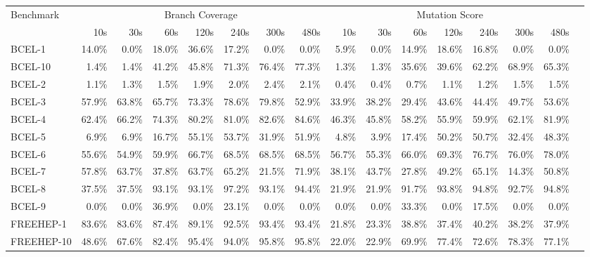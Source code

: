\begin{tabular}{ l rrrrrrr rrrrrrrr}\toprule 
 Benchmark &  \multicolumn{7}{c}{Branch Coverage} &  \multicolumn{7}{c}{Mutation Score}\\ 
 & 10s & 30s & 60s & 120s & 240s & 300s & 480s & 10s & 30s & 60s & 120s & 240s & 300s & 480s \\ 
\midrule 
BCEL-1 &  14.0\% &  0.0\% &  18.0\% &  36.6\% &  17.2\% &  0.0\% &  0.0\% &  5.9\% &  0.0\% &  14.9\% &  18.6\% &  16.8\% &  0.0\% &  0.0\%\\ 
BCEL-10 &  1.4\% &  1.4\% &  41.2\% &  45.8\% &  71.3\% &  76.4\% &  77.3\% &  1.3\% &  1.3\% &  35.6\% &  39.6\% &  62.2\% &  68.9\% &  65.3\%\\ 
BCEL-2 &  1.1\% &  1.3\% &  1.5\% &  1.9\% &  2.0\% &  2.4\% &  2.1\% &  0.4\% &  0.4\% &  0.7\% &  1.1\% &  1.2\% &  1.5\% &  1.5\%\\ 
BCEL-3 &  57.9\% &  63.8\% &  65.7\% &  73.3\% &  78.6\% &  79.8\% &  52.9\% &  33.9\% &  38.2\% &  29.4\% &  43.6\% &  44.4\% &  49.7\% &  53.6\%\\ 
BCEL-4 &  62.4\% &  66.2\% &  74.3\% &  80.2\% &  81.0\% &  82.6\% &  84.6\% &  46.3\% &  45.8\% &  58.2\% &  55.9\% &  59.9\% &  62.1\% &  81.9\%\\ 
BCEL-5 &  6.9\% &  6.9\% &  16.7\% &  55.1\% &  53.7\% &  31.9\% &  51.9\% &  4.8\% &  3.9\% &  17.4\% &  50.2\% &  50.7\% &  32.4\% &  48.3\%\\ 
BCEL-6 &  55.6\% &  54.9\% &  59.9\% &  66.7\% &  68.5\% &  68.5\% &  68.5\% &  56.7\% &  55.3\% &  66.0\% &  69.3\% &  76.7\% &  76.0\% &  78.0\%\\ 
BCEL-7 &  57.8\% &  63.7\% &  37.8\% &  63.7\% &  65.2\% &  21.5\% &  71.9\% &  38.1\% &  43.7\% &  27.8\% &  49.2\% &  65.1\% &  14.3\% &  50.8\%\\ 
BCEL-8 &  37.5\% &  37.5\% &  93.1\% &  93.1\% &  97.2\% &  93.1\% &  94.4\% &  21.9\% &  21.9\% &  91.7\% &  93.8\% &  94.8\% &  92.7\% &  94.8\%\\ 
BCEL-9 &  0.0\% &  0.0\% &  36.9\% &  0.0\% &  23.1\% &  0.0\% &  0.0\% &  0.0\% &  0.0\% &  33.3\% &  0.0\% &  17.5\% &  0.0\% &  0.0\%\\ 
FREEHEP-1 &  83.6\% &  83.6\% &  87.4\% &  89.1\% &  92.5\% &  93.4\% &  93.4\% &  21.8\% &  23.3\% &  38.8\% &  37.4\% &  40.2\% &  38.2\% &  37.9\%\\ 
FREEHEP-10 &  48.6\% &  67.6\% &  82.4\% &  95.4\% &  94.0\% &  95.8\% &  95.8\% &  22.0\% &  22.9\% &  69.9\% &  77.4\% &  72.6\% &  78.3\% &  77.1\%\\ 

\end{tabular}
